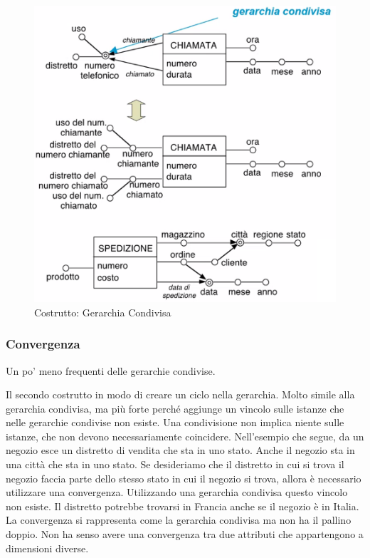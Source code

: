 \begin{figure}[H]
	\begin{center}
		\includegraphics[width=0.7\linewidth]{img/gercond.png}
		\caption{Costrutto: Gerarchia Condivisa}
	\end{center}
\end{figure}

\subsubsection{Convergenza}
\begin{info}
	Un po' meno frequenti delle gerarchie condivise.
\end{info}
Il secondo costrutto in modo di creare un ciclo nella gerarchia. Molto simile alla gerarchia condivisa, ma più forte perché aggiunge un vincolo sulle istanze che nelle gerarchie condivise non esiste.
Una condivisione non implica niente sulle istanze, che non devono necessariamente coincidere.\newline
Nell'esempio che segue, da un negozio esce un distretto di vendita che sta in uno stato. Anche il negozio sta in una città che sta in uno stato. Se desideriamo che il distretto in cui si trova il negozio faccia parte dello stesso stato in cui il negozio si trova, allora è necessario utilizzare una convergenza.\newline
Utilizzando una gerarchia condivisa questo vincolo non esiste. Il distretto potrebbe trovarsi in Francia anche se il negozio è in Italia. La convergenza si rappresenta come la gerarchia condivisa ma non ha il pallino doppio.\newline
Non ha senso avere una convergenza tra due attributi che appartengono a dimensioni diverse.

